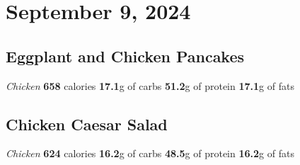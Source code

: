 \documentclass{article}%
\begin{document}
\section*{September 9, 2024}%
\label{sec:September9,2024}%
\begin{paracol}[2]{2}%
\sloppy%
\subsection*{Eggplant and Chicken Pancakes}%
\label{subsec:EggplantandChickenPancakes}%
\textit{Chicken}%
\newline%
\newline%
\textbf{658} calories%
\newline%
\textbf{17.1}g of carbs%
\newline%
\textbf{51.2}g of protein%
\newline%
\textbf{17.1}g of fats%
\newline%
\switchcolumn

%
\subsection*{Chicken Caesar Salad}%
\label{subsec:ChickenCaesarSalad}%
\textit{Chicken}%
\newline%
\newline%
\textbf{624} calories%
\newline%
\textbf{16.2}g of carbs%
\newline%
\textbf{48.5}g of protein%
\newline%
\textbf{16.2}g of fats%
\newline%
\switchcolumn

%
\end{paracol}

%
\end{document}
